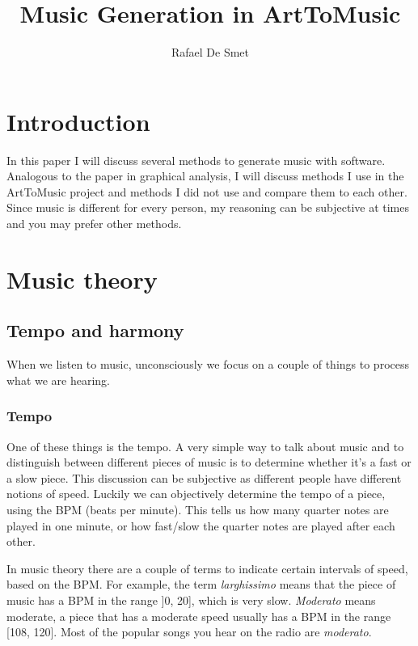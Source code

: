 \documentclass[12pt]{article}
\begin{document}
\title{Music Generation in ArtToMusic}
\author{Rafael De Smet}

\maketitle
\tableofcontents

\section{Introduction}

In this paper I will discuss several methods to generate music with software. Analogous to the paper in graphical analysis, I will discuss methods I use in the ArtToMusic project and methods I did not use and compare them to each other. Since music is different for every person, my reasoning can be subjective at times and you may prefer other methods. 

\section{Music theory}

\subsection{Tempo and harmony}

When we listen to music, unconsciously we focus on a couple of things to process what we are hearing.

\subsubsection{Tempo}

One of these things is the tempo. A very simple way to talk about music and to distinguish between different pieces of music is to determine whether it's a fast or a slow piece. This discussion can be subjective as different people have different notions of speed. Luckily we can objectively determine the tempo of a piece, using the BPM (beats per minute).
This tells us how many quarter notes are played in one minute, or how fast/slow the quarter notes are played after each other.
\newline

In music theory there are a couple of terms to indicate certain intervals of speed, based on the BPM. For example, the term \textit{larghissimo} means that the piece of music has a BPM in the range ]0, 20], which is very slow. \textit{Moderato} means moderate, a piece that has a moderate speed usually has a BPM in the range [108, 120]. Most of the popular songs you hear on the radio are \textit{moderato}.
\end{document}
